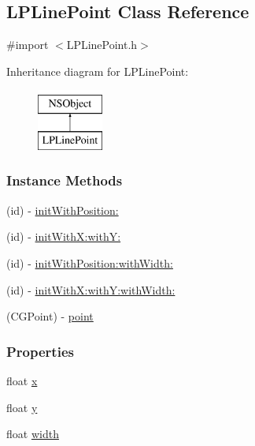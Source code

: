 \hypertarget{interface_l_p_line_point}{\subsection{L\-P\-Line\-Point Class Reference}
\label{d6/dab/interface_l_p_line_point}
}


{\ttfamily \#import $<$L\-P\-Line\-Point.\-h$>$}

Inheritance diagram for L\-P\-Line\-Point\-:\begin{figure}[H]
\begin{center}
\leavevmode
\includegraphics[height=2.000000cm]{d6/dab/interface_l_p_line_point}
\end{center}
\end{figure}
\subsubsection*{Instance Methods}
\begin{DoxyCompactItemize}
\item 
(id) -\/ \hyperlink{interface_l_p_line_point_a6ad6bb58075f8a4304f5987e2a62fe7f}{init\-With\-Position\-:}
\item 
(id) -\/ \hyperlink{interface_l_p_line_point_a78f4149d3bb41fe6f98c3eed65be2395}{init\-With\-X\-:with\-Y\-:}
\item 
(id) -\/ \hyperlink{interface_l_p_line_point_af514651adc0da65e9c62b551a576bd7a}{init\-With\-Position\-:with\-Width\-:}
\item 
(id) -\/ \hyperlink{interface_l_p_line_point_ad1f9c17d1938f324639495ce3fa5fd80}{init\-With\-X\-:with\-Y\-:with\-Width\-:}
\item 
(C\-G\-Point) -\/ \hyperlink{interface_l_p_line_point_a6cb916c0bd397a0580a4b506b3322b69}{point}
\end{DoxyCompactItemize}
\subsubsection*{Properties}
\begin{DoxyCompactItemize}
\item 
float \hyperlink{interface_l_p_line_point_abc1309a6c53c6ca75ead346c748b3f7b}{x}
\item 
float \hyperlink{interface_l_p_line_point_ad03af34f7646b5e17a9d5a70a82ce36e}{y}
\item 
float \hyperlink{interface_l_p_line_point_aa4cb4e74747c8c5e7b61e3de32c8da2c}{width}
\end{DoxyCompactItemize}


